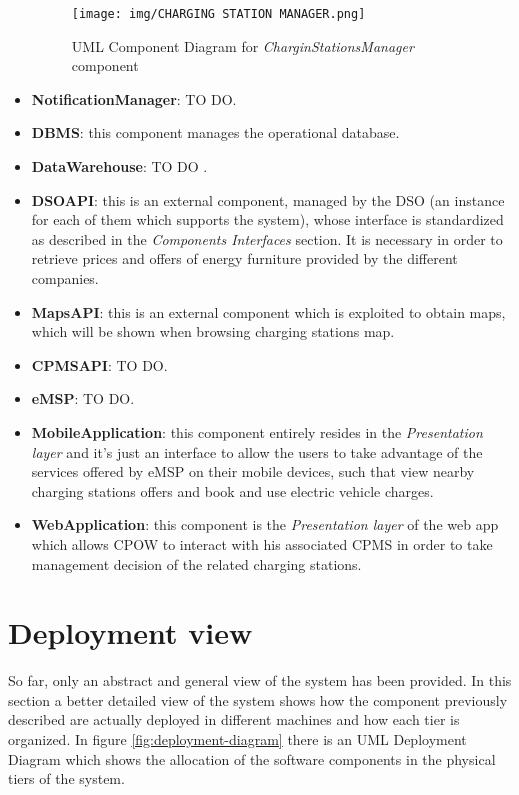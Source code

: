 \documentclass[a4paper]{report}
\begin{document}
\begin{itemize}
\begin{figure}[htp]
\centering
\texttt{[image: img/CHARGING STATION MANAGER.png]}
\caption{UML Component Diagram for \textit{CharginStationsManager} component}
\label{fig:chargingstationsmgr-component}
\end{figure}

\item \textbf{NotificationManager}: TO DO.

\item \textbf{DBMS}: this component manages the operational database.

\item \textbf{DataWarehouse}: TO DO .

\item \textbf{DSOAPI}: this is an external component, managed by the DSO (an instance for each of them which supports the system), whose interface is standardized as described in the \textit{Components Interfaces} section. It is necessary in order to retrieve prices and offers of energy furniture provided by the different companies.

\item \textbf{MapsAPI}: this is an external component which is exploited to obtain maps, which will be shown when browsing charging stations map.

\item \textbf{CPMSAPI}: TO DO.

\item \textbf{eMSP}: TO DO.

\item \textbf{MobileApplication}: this component entirely resides in the \textit{Presentation layer} and it's just an interface to allow the users to take advantage of the services offered by eMSP on their mobile devices, such that view nearby charging stations offers and book and use electric vehicle charges.

\item \textbf{WebApplication}: this component is the \textit{Presentation layer} of the web app which allows CPOW to interact with his associated CPMS in order to take management decision of the related charging stations.
\end{itemize}

\section{Deployment view}

So far, only an abstract and general view of the system has been provided. In this section a better detailed view of the system shows how the component previously described are actually deployed in different machines and how each tier is organized.
In figure \ref{fig:deployment-diagram} there is an UML Deployment Diagram which shows the allocation of the software components in the physical tiers of the system.
\end{document}

